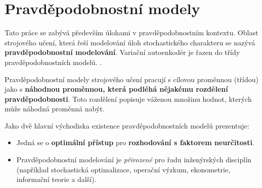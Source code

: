 \section{Pravděpodobnostní modely}
\label{sec:probabilstic_models}
Tato práce se zabývá především úlohami v pravděpodobnostním kontextu.
Oblast strojového učení, která řeší modelování úloh stochastického charakteru se nazývá \textbf{pravděpodobnostní modelování}.
Variační autoenkodér je řazen do třídy pravděpodobnostních modelů. \cite{Kingma2019}.

Pravděpodobnostní modely strojového učení pracují s cílovou proměnnou (třídou) jako s \textbf{náhodnou proměnnou, která podléhá nějakému rozdělení pravděpodobnosti}.
Toto rozdělení popisuje váženou množinu hodnot, kterých může náhodná proměnná nabýt. \cite{Murphy2022}

Jako dvě hlavní východiska existence pravděpodobnostních modelů \textcite{Murphy2022} prezentuje:

\begin{itemize}
    \item Jedná se o \textbf{optimální přístup} pro \textbf{rozhodování s faktorem neurčitosti}.
    \item Pravděpodobnostní modelování je \emph{přirozené} pro řadu inženýrských disciplín (například stochastická optimalizace, operační výzkum, ekonometrie, informační teorie a další).
\end{itemize}

